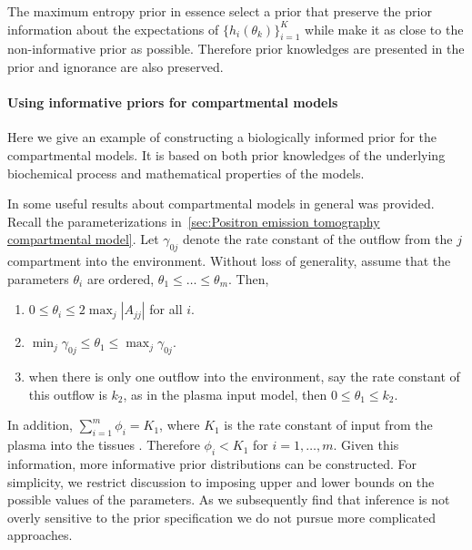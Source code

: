 The maximum entropy prior in essence select a prior that preserve the prior
information about the expectations of $\{h_i(\theta_k)\}_{i=1}^K$ while make
it as close to the non-informative prior as possible. Therefore prior
knowledges are presented in the prior and ignorance are also preserved.

\paragraph{Using informative priors for \pet compartmental models}

Here we give an example of constructing a biologically informed prior for the
\pet compartmental models. It is based on both prior knowledges of the
underlying biochemical process and mathematical properties of the models.

In \cite{Anderson:1983wk} some useful results about compartmental models in
general was provided. Recall the parameterizations in~\ref{sec:Positron
  emission tomography compartmental model}. Let $\gamma_{0j}$ denote the rate
constant of the outflow from the $j$\xth compartment into the environment.
Without loss of generality, assume that the parameters $\theta_i$ are ordered,
$\theta_1 \le \dots \le \theta_m$. Then,
\begin{enumerate}
  \item $0 \le \theta_i \le 2\max_j|A_{jj}|$ for all $i$.
  \item $\min_j\gamma_{0j} \le \theta_1 \le \max_j\gamma_{0j}$.
  \item when there is only one outflow into the environment, say the rate
    constant of this outflow is $k_2$, as in the plasma input model, then $0
    \le \theta_1 \le k_2$.
\end{enumerate}
In addition, $\sum_{i=1}^m \phi_i = K_1$, where $K_1$ is the rate constant of
input from the plasma into the tissues \cite{Gunn:2001cx}. Therefore $\phi_i <
K_1$ for $i = 1, \dots, m$. Given this information, more informative prior
distributions can be constructed. For simplicity, we restrict discussion to
imposing upper and lower bounds on the possible values of the parameters. As
we subsequently find that inference is not overly sensitive to the prior
specification we do not pursue more complicated approaches.

